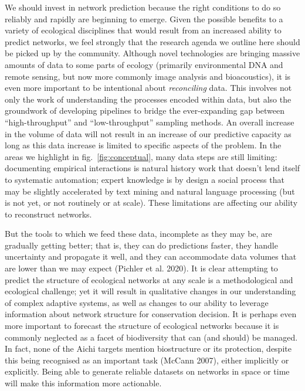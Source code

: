 \documentclass[10pt,oneside]{article}
\begin{document}
We should invest in network prediction because the right conditions to
do so reliably and rapidly are beginning to emerge. Given the possible
benefits to a variety of ecological disciplines that would result from
an increased ability to predict networks, we feel strongly that the
research agenda we outline here should be picked up by the community.
Although novel technologies are bringing massive amounts of data to some
parts of ecology (primarily environmental DNA and remote sensing, but
now more commonly image analysis and bioacoustics), it is even more
important to be intentional about \emph{reconciling} data. This involves
not only the work of understanding the processes encoded within data,
but also the groundwork of developing pipelines to bridge the
ever-expanding gap between ``high-throughput'' and ``low-throughput''
sampling methods. An overall increase in the volume of data will not
result in an increase of our predictive capacity as long as this data
increase is limited to specific aspects of the problem. In the areas we
highlight in fig.~\ref{fig:conceptual}, many data steps are still
limiting: documenting empirical interactions is natural history work
that doesn't lend itself to systematic automation; expert knowledge is
by design a social process that may be slightly accelerated by text
mining and natural language processing (but is not yet, or not routinely
or at scale). These limitations are affecting our ability to reconstruct
networks.

But the tools to which we feed these data, incomplete as they may be,
are gradually getting better; that is, they can do predictions faster,
they handle uncertainty and propagate it well, and they can accommodate
data volumes that are lower than we may expect (Pichler et al. 2020). It
is clear attempting to predict the structure of ecological networks at
any scale is a methodological and ecological challenge; yet it will
result in qualitative changes in our understanding of complex adaptive
systems, as well as changes to our ability to leverage information about
network structure for conservation decision. It is perhaps even more
important to forecast the structure of ecological networks because it is
commonly neglected as a facet of biodiversity that can (and should) be
managed. In fact, none of the Aichi targets mention biostructure or its
protection, despite this being recognised as an important task (McCann
2007), either implicitly or explicitly. Being able to generate reliable
datasets on networks in space or time will make this information more
actionable.
\end{document}
